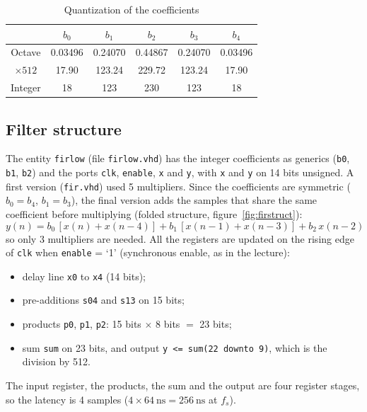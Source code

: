 \documentclass[11pt,a4paper]{article}
\renewcommand{\_}{\oldunderscore\allowbreak}
\begin{document}
\begin{table}[H]
\centering
\begin{tabular}{cccccc}
\toprule
 & $b_0$ & $b_1$ & $b_2$ & $b_3$ & $b_4$ \\
\midrule
Octave            & 0.03496 & 0.24070 & 0.44867 & 0.24070 & 0.03496 \\
$\times 512$      & 17.90 & 123.24 & 229.72 & 123.24 & 17.90 \\
Integer           & 18 & 123 & 230 & 123 & 18 \\
\bottomrule
\end{tabular}
\caption{Quantization of the coefficients}\label{tab:coef}
\end{table}

\subsection{Filter structure}
The entity \texttt{fir\_low} (file \texttt{fir\_low.vhd}) has the integer
coefficients as generics (\texttt{b0}, \texttt{b1}, \texttt{b2}) and the
ports \texttt{clk}, \texttt{enable}, \texttt{x} and \texttt{y}, with
\texttt{x} and \texttt{y} on 14 bits unsigned. A first version
(\texttt{fir.vhd}) used 5 multipliers. Since the coefficients are symmetric
($b_0 = b_4$, $b_1 = b_3$), the final version adds the samples that share the
same coefficient before multiplying (folded structure,
figure~\ref{fig:firstruct}):
\[
y(n) = b_0\,[x(n) + x(n-4)] + b_1\,[x(n-1) + x(n-3)] + b_2\,x(n-2)
\]
so only 3 multipliers are needed. All the registers are updated on the rising
edge of \texttt{clk} when \texttt{enable} = `1' (synchronous enable, as in the
lecture):
\begin{itemize}
  \item delay line \texttt{x0} to \texttt{x4} (14 bits);
  \item pre-additions \texttt{s04} and \texttt{s13} on 15 bits;
  \item products \texttt{p0}, \texttt{p1}, \texttt{p2}: 15 bits $\times$ 8 bits
        $=$ 23 bits;
  \item sum \texttt{sum} on 23 bits, and output \texttt{y <= sum(22 downto 9)},
        which is the division by 512.
\end{itemize}
The input register, the products, the sum and the output are four register
stages, so the latency is 4 samples ($4 \times \SI{64}{\nano\second} =
\SI{256}{\nano\second}$ at $f_s$).
\end{document}
